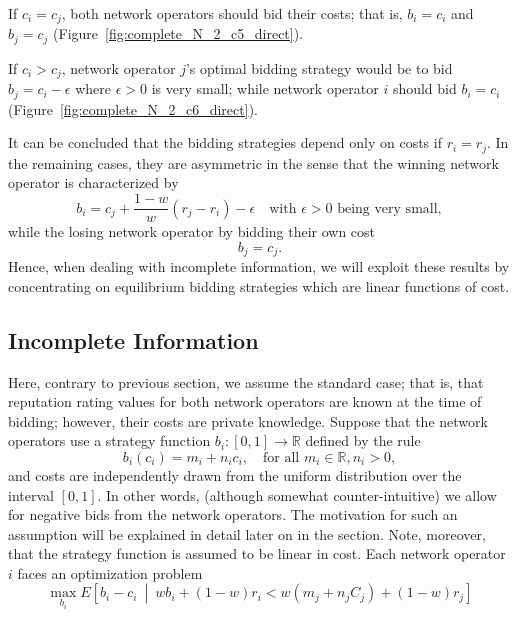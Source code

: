 If $c_i = c_j$, both network operators should bid their costs; that is, $b_i = c_i$ and $b_j = c_j$ (Figure~\ref{fig:complete_N_2_c5_direct}).

If $c_i > c_j$, network operator $j$'s optimal bidding strategy would be to bid $b_j = c_i - \epsilon$ where $\epsilon>0$ is very small; while network operator $i$ should bid $b_i = c_i$ (Figure~\ref{fig:complete_N_2_c6_direct}).

It can be concluded that the bidding strategies depend only on costs if $r_i = r_j$. In the remaining cases, they are asymmetric in the sense that the winning network operator is characterized by
\begin{equation*}
	b_i = c_j + \frac{1-w}{w}(r_j - r_i) - \epsilon \quad\text{with }\epsilon>0\text{ being very small},
\end{equation*}
while the losing network operator by bidding their own cost
\begin{equation*}
	b_j = c_j.
\end{equation*}
Hence, when dealing with incomplete information, we will exploit these results by concentrating on equilibrium bidding strategies which are linear functions of cost.

\subsection{Incomplete Information} %
\label{sub:incomplete_information_n_2_direct}
Here, contrary to previous section, we assume the standard case; that is, that reputation rating values for both network operators are known at the time of bidding; however, their costs are private knowledge. Suppose that the network operators use a strategy function $b_i: [0,1]\to\mathbb{R}$ defined by the rule
\begin{equation}
	\label{eq:pcomp_bidding_str_direct}
	b_i(c_i) = m_i + n_i c_i,\quad\text{for all } m_i\in\mathbb{R},n_i>0,
\end{equation}
and costs are independently drawn from the uniform distribution over the interval $[0,1]$. In other words, (although somewhat counter-intuitive) we allow for negative bids from the network operators. The motivation for such an assumption will be explained in detail later on in the section. Note, moreover, that the strategy function is assumed to be linear in cost. Each network operator $i$ faces an optimization problem
\begin{equation}
	\label{eq:pcomp_exp_utility_uc_direct}
	\max_{b_i}E \left[ b_i-c_i \:\middle\vert\: wb_i + (1-w)r_i < w(m_j + n_j C_j) + (1-w)r_j\right]
\end{equation}

